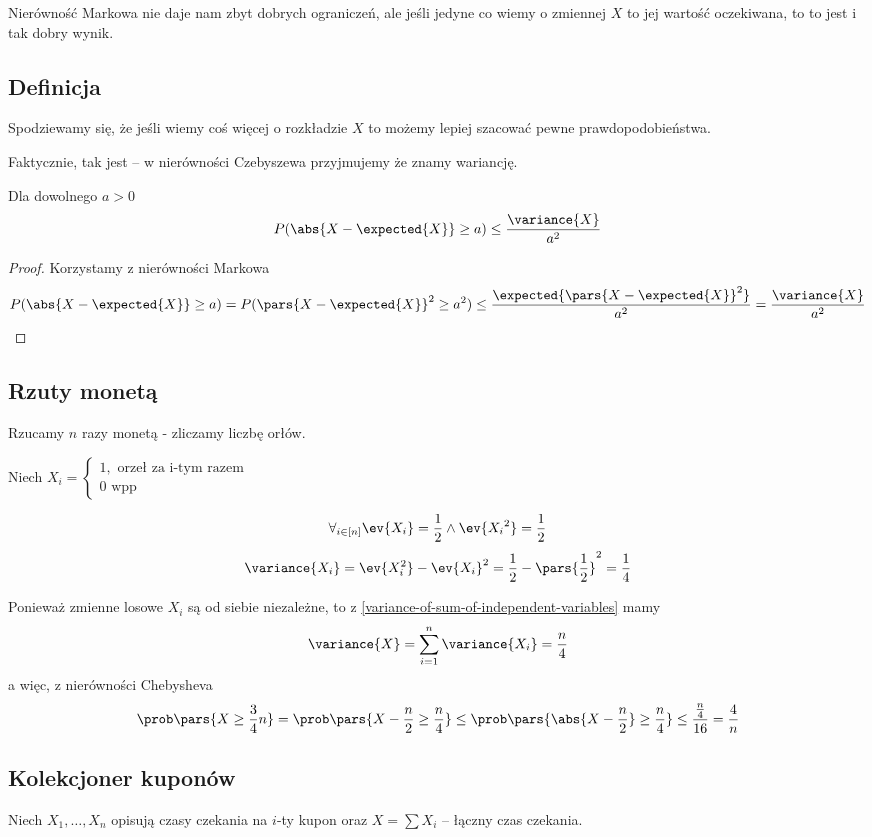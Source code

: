 Nierówność Markowa nie daje nam zbyt dobrych ograniczeń, ale jeśli jedyne co wiemy o zmiennej \( X \) to jej wartość oczekiwana, to to jest i tak dobry wynik.
\subsection{Definicja}
Spodziewamy się, że jeśli wiemy coś więcej o rozkładzie \( X \) to możemy lepiej szacować pewne prawdopodobieństwa.

Faktycznie, tak jest -- w nierówności Czebyszewa przyjmujemy że znamy wariancję.

\begin{theorem}[Twierdzenie 3.6 P\&C]
	\label{chebyshev-inequality}
	Dla dowolnego \( a > 0 \)
	\[
		P(\abs{X - \expected{X}} \geq a) \leq \frac{\variance{X}}{a^2}
	\]
\end{theorem}
\begin{proof}
	Korzystamy z nierówności Markowa
	\[
		P(\abs{X - \expected{X}} \geq a) = P(\pars{X - \expected{X}}^2 \geq a^2)
		\leq \frac{\expected{\pars{X - \expected{X}}^2}}{a^2} = \frac{\variance{X}}{a^2}
	\]
\end{proof}

\subsection{Rzuty monetą}
\label{chebyshev-coin-tosses}

Rzucamy \(n\) razy monetą - zliczamy liczbę orłów.

Niech \(X_i = \begin{cases}
	1, \text{ orzeł za i-tym razem} \\
	0 \text{ wpp}
\end{cases}\)

\[
	\forall_{i \in [n]} \ev{X_i} = \frac{1}{2} \land \ev{{X_i}^2} = \frac{1}{2}
\]
\[
	\variance{X_i} = \ev{X_i^2} - \ev{X_i}^2 = \frac{1}{2} - \pars{\frac{1}{2}}^2 = \frac{1}{4}
\]

Ponieważ zmienne losowe \(X_i\) są od siebie niezależne, to z \ref{variance-of-sum-of-independent-variables} mamy
\[
	\variance{X} = \sum_{i=1}^n \variance{X_i} = \frac{n}{4}
\]
a więc, z nierówności Chebysheva
\[
	\prob\pars{X \geq \frac{3}{4}n} = \prob\pars{X - \frac{n}{2} \geq \frac{n}{4}} \leq \prob\pars{\abs{X - \frac{n}{2}} \geq \frac{n}{4}} \leq \frac{\frac{n}{4}}{16} = \frac{4}{n}
\]

\subsection{Kolekcjoner kuponów}
\label{chebyshev-coupon-collector}
Niech \( X_1, \dots, X_n \) opisują czasy czekania na \( i \)-ty kupon oraz \( X = \sum X_i \) -- łączny czas czekania.

